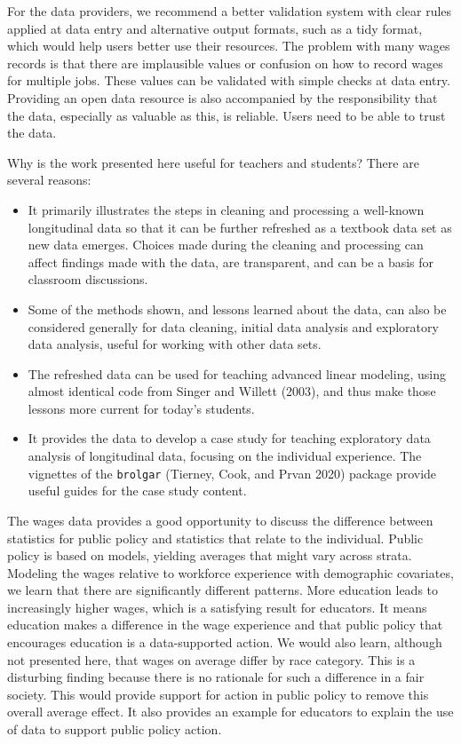 \documentclass[12pt]{article}
\providecommand{\tightlist}{%
  \setlength{\itemsep}{0pt}\setlength{\parskip}{0pt}}
\begin{document}
For the data providers, we recommend a better validation system with clear rules applied at data entry and alternative output formats, such as a tidy format, which would help users better use their resources. The problem with many wages records is that there are implausible values or confusion on how to record wages for multiple jobs. These values can be validated with simple checks at data entry. Providing an open data resource is also accompanied by the responsibility that the data, especially as valuable as this, is reliable. Users need to be able to trust the data.

Why is the work presented here useful for teachers and students? There are several reasons:

\begin{itemize}
\tightlist
\item
  It primarily illustrates the steps in cleaning and processing a well-known longitudinal data so that it can be further refreshed as a textbook data set as new data emerges. Choices made during the cleaning and processing can affect findings made with the data, are transparent, and can be a basis for classroom discussions.
\item
  Some of the methods shown, and lessons learned about the data, can also be considered generally for data cleaning, initial data analysis and exploratory data analysis, useful for working with other data sets.
\item
  The refreshed data can be used for teaching advanced linear modeling, using almost identical code from Singer and Willett (2003), and thus make those lessons more current for today's students.
\item
  It provides the data to develop a case study for teaching exploratory data analysis of longitudinal data, focusing on the individual experience. The vignettes of the \texttt{brolgar} (Tierney, Cook, and Prvan 2020) package provide useful guides for the case study content.
\end{itemize}

The wages data provides a good opportunity to discuss the difference between statistics for public policy and statistics that relate to the individual. Public policy is based on models, yielding averages that might vary across strata. Modeling the wages relative to workforce experience with demographic covariates, we learn that there are significantly different patterns. More education leads to increasingly higher wages, which is a satisfying result for educators. It means education makes a difference in the wage experience and that public policy that encourages education is a data-supported action. We would also learn, although not presented here, that wages on average differ by race category. This is a disturbing finding because there is no rationale for such a difference in a fair society. This would provide support for action in public policy to remove this overall average effect. It also provides an example for educators to explain the use of data to support public policy action.
\end{document}
